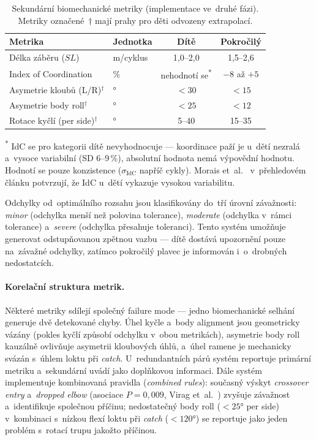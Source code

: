 \begin{table}[htbp]
\centering
\caption{Sekundární biomechanické metriky (implementace ve~druhé fázi). Metriky označené~$\dagger$ mají prahy pro děti odvozeny extrapolací.}
\label{tab:metriky_sekundarni}
\small
\begin{tabular}{llcc}
\toprule
\textbf{Metrika} & \textbf{Jednotka} & \textbf{Dítě} & \textbf{Pokročilý} \\
\midrule
Délka záběru ($SL$) & m/cyklus & 1,0--2,0 & 1,5--2,6 \\
Index of Coordination & \% & nehodnotí se\textsuperscript{*} & $-8$ až $+5$ \\
Asymetrie kloubů (L/R)$^\dagger$ & $°$ & $< 30$ & $< 15$ \\
Asymetrie body roll$^\dagger$ & $°$ & $< 25$ & $< 12$ \\
Rotace kyčlí (per side)$^\dagger$ & $°$ & 5--40 & 15--35 \\
\bottomrule
\end{tabular}

\smallskip
\noindent\textsuperscript{*} IdC se pro kategorii dítě nevyhodnocuje --- koordinace paží je u~dětí nezralá a~vysoce variabilní (SD 6--9\,\%), absolutní hodnota nemá výpovědní hodnotu. Hodnotí se pouze konzistence ($\sigma_{\mathrm{IdC}}$ napříč cykly). Morais et~al.~\cite{morais2021review} v~přehledovém článku potvrzují, že IdC u~dětí vykazuje vysokou variabilitu.
\end{table}

Odchylky od~optimálního rozsahu jsou klasifikovány do~tří úrovní závažnosti: \textit{minor} (odchylka menší než polovina tolerance), \textit{moderate} (odchylka v~rámci tolerance) a~\textit{severe} (odchylka přesahuje toleranci). Tento systém umožňuje generovat odstupňovanou zpětnou vazbu --- dítě dostává upozornění pouze na~závažné odchylky, zatímco pokročilý plavec je informován i~o~drobných nedostatcích.

\paragraph{Korelační struktura metrik.} Některé metriky sdílejí společný failure mode --- jedno biomechanické selhání generuje dvě detekované chyby. Úhel kyčle a~body alignment jsou geometricky vázány (pokles kyčlí způsobí odchylku v~obou metrikách), asymetrie body roll kauzálně ovlivňuje asymetrii kloubových úhlů, a~úhel ramene je mechanicky svázán s~úhlem loktu při \textit{catch}. U~redundantních párů systém reportuje primární metriku a~sekundární uvádí jako doplňkovou informaci. Dále systém implementuje kombinovaná pravidla (\textit{combined rules}): současný výskyt \textit{crossover entry} a~\textit{dropped elbow} (asociace $P = 0{,}009$, Virag et~al.~\cite{virag2014}) zvyšuje závažnost a~identifikuje společnou příčinu; nedostatečný body roll ($< 25°$ per side) v~kombinaci s~nízkou flexí loktu při \textit{catch} ($< 120°$) se reportuje jako jeden problém s~rotací trupu jakožto příčinou.

